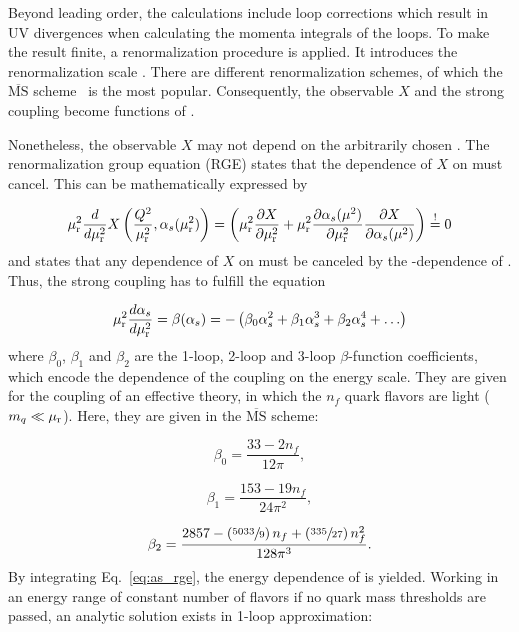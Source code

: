 Beyond leading order, the calculations include loop corrections which result in
UV divergences when calculating the momenta integrals of the loops. To make the
result finite, a renormalization procedure is applied. It introduces the
renormalization scale \mur. There are different renormalization schemes, of
which the $\overline{\mathrm{MS}}$ scheme~\cite{Weinberg:1951ss,tHooft:1973mm}
is the most popular. Consequently, the observable $X$ and the strong coupling
become functions of \mur. 

Nonetheless, the observable $X$ may not depend on the arbitrarily chosen \mur.
The renormalization group equation (RGE) states that the dependence of $X$ on
\mur must cancel. This can be mathematically expressed by

\begin{equation*} 
    \mu_{\mathrm{r}}^2 \frac{d}{d \mu_{\mathrm{r}}^2} X \left(\frac{Q^2}{\mu_{\mathrm{r}}^2},\alpha_{s}(\mu_{\mathrm{r}}^2)\right) = \left(
    \mu_{\mathrm{r}}^2 \frac{\partial X}{\partial \mu_{\mathrm{r}}^2} + \mu_{\mathrm{r}}^2 \frac{\partial
    \alpha_{s}(\mu^2)}{\partial \mu_{\mathrm{r}}^2} \frac{\partial X}{\partial \alpha_{s}(\mu^2)} \right) \stackrel{!}{=} 0 
\end{equation*}
%
and states that any dependence of $X$ on \mur must be canceled by the
\mur-dependence of \as. Thus, the strong coupling has to fulfill the
equation

\begin{equation*}
    \mu_{\mathrm{r}}^2 \frac{d \alpha_{s}}{d \mu_{\mathrm{r}}^2} = \beta(\alpha_{s}) = - \left( \beta_0 \alpha_{s}^2 + \beta_1 \alpha_{s}^3
    + \beta_2 \alpha_{s}^4 + \ldots \right)
    \label{eq:as_rge}
\end{equation*}
%
where $\beta_0$, $\beta_1$ and $\beta_2$ are the 1-loop, 2-loop and 3-loop 
$\beta$-function coefficients, which encode the dependence of the coupling
on the energy scale. They are given for the coupling of an effective
theory, in which the $n_f$ quark flavors are light ($m_q \ll \mu_{\mathrm{r}}$). Here, they
are given in the $\overline{\mathrm{MS}}$ scheme:

\begin{equation*} 
    \beta_0 = \frac{33 - 2 n_f}{12\pi},
\end{equation*}

\begin{equation*} 
    \beta_1 = \frac{153 - 19 n_f}{24\pi^2},
\end{equation*}

\begin{equation*} 
   \beta_2 = \frac{2857 -\left(\sfrac{5033}{9}\right)n_f + \left(\sfrac{335}{27}
   \right)n_f^2}{128 \pi^3}.
\end{equation*}
%
By integrating Eq.~\ref{eq:as_rge}, the energy dependence of \as is yielded.
Working in an energy range of constant number of flavors \ie if no quark mass
thresholds are passed, an analytic solution exists in 1-loop approximation:

